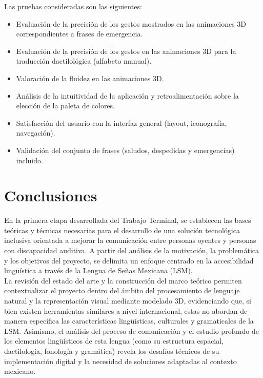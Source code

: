 Las pruebas consideradas son las siguientes:
\begin{itemize}
\item Evaluación de la precisión de los gestos mostrados en las animaciones 3D correspondientes a frases de emergencia.
\item Evaluación de la precisión de los gestos en las animaciones 3D para la traducción dactilológica (alfabeto manual).
\item Valoración de la fluidez en las animaciones 3D.
\item Análisis de la intuitividad de la aplicación y retroalimentación sobre la elección de la paleta de colores.
\item Satisfacción del usuario con la interfaz general (layout, iconografía, navegación).
\item Validación del conjunto de frases (saludos, despedidas y emergencias) incluido.
\end{itemize}


\chapter{Conclusiones}
En la primera etapa desarrollada del Trabajo Terminal, se establecen las bases teóricas y técnicas necesarias para el desarrollo de una solución tecnológica inclusiva orientada a mejorar la comunicación entre personas oyentes y personas con discapacidad auditiva. A partir del análisis de la motivación, la problemática y los objetivos del proyecto, se delimita un enfoque centrado en la accesibilidad lingüística a través de la Lengua de Señas Mexicana (LSM).\\

La revisión del estado del arte y la construcción del marco teórico permiten contextualizar el proyecto dentro del ámbito del procesamiento de lenguaje natural y la representación visual mediante modelado 3D, evidenciando que, si bien existen herramientas similares a nivel internacional, estas no abordan de manera específica las características lingüísticas, culturales y gramaticales de la LSM. Asimismo, el análisis del proceso de comunicación y el estudio profundo de los elementos lingüísticos de esta lengua (como su estructura espacial, dactilología, fonología y gramática) revela los desafíos técnicos de su implementación digital y la necesidad de soluciones adaptadas al contexto mexicano.




